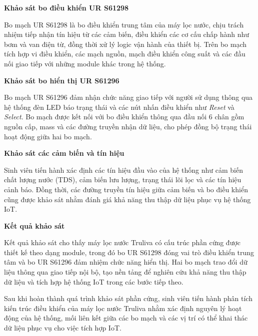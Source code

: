 \vspace{0.5em}

\textbf{Khảo sát bo điều khiển UR S61298}

Bo mạch UR S61298 là bo điều khiển trung tâm của máy lọc nước, chịu trách nhiệm tiếp nhận tín hiệu từ các cảm biến, điều khiển các cơ cấu chấp hành như bơm và van điện từ, đồng thời xử lý logic vận hành của thiết bị. Trên bo mạch tích hợp vi điều khiển, các mạch nguồn, mạch điều khiển công suất và các đầu nối giao tiếp với những module khác trong hệ thống.

\vspace{0.5em}

\textbf{Khảo sát bo hiển thị UR S61296}

Bo mạch UR S61296 đảm nhận chức năng giao tiếp với người sử dụng thông qua hệ thống đèn LED báo trạng thái và các nút nhấn điều khiển như \textit{Reset} và \textit{Select}. Bo mạch được kết nối với bo điều khiển thông qua đầu nối 6 chân gồm nguồn cấp, mass và các đường truyền nhận dữ liệu, cho phép đồng bộ trạng thái hoạt động giữa hai bo mạch.

\vspace{0.5em}

\textbf{Khảo sát các cảm biến và tín hiệu}

Sinh viên tiến hành xác định các tín hiệu đầu vào của hệ thống như cảm biến chất lượng nước (TDS), cảm biến lưu lượng, trạng thái lõi lọc và các tín hiệu cảnh báo. Đồng thời, các đường truyền tín hiệu giữa cảm biến và bo điều khiển cũng được khảo sát nhằm đánh giá khả năng thu thập dữ liệu phục vụ hệ thống IoT.

\vspace{0.5em}

\textbf{Kết quả khảo sát}

Kết quả khảo sát cho thấy máy lọc nước Truliva có cấu trúc phần cứng được thiết kế theo dạng module, trong đó bo UR S61298 đóng vai trò điều khiển trung tâm và bo UR S61296 đảm nhiệm chức năng hiển thị. Hai bo mạch trao đổi dữ liệu thông qua giao tiếp nội bộ, tạo nền tảng để nghiên cứu khả năng thu thập dữ liệu và tích hợp hệ thống IoT trong các bước tiếp theo.

Sau khi hoàn thành quá trình khảo sát phần cứng, sinh viên tiến hành phân tích kiến trúc điều khiển của máy lọc nước Truliva nhằm xác định nguyên lý hoạt động của hệ thống, mối liên kết giữa các bo mạch và các vị trí có thể khai thác dữ liệu phục vụ cho việc tích hợp IoT.

